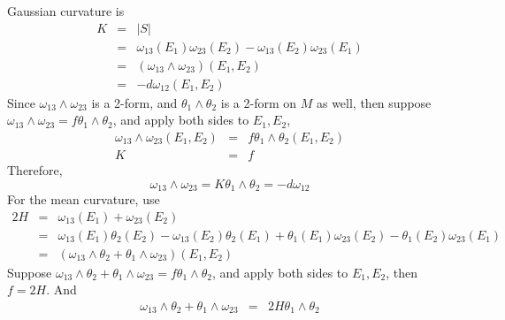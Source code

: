 \documentclass{article}
\newcommand{\exterior}{\wedge}
\begin{document}
Gaussian curvature is
\begin{eqnarray*}
  K & = & | S |\\
  & = & \omega_{13} (E_1) \omega_{23} (E_2) - \omega_{13} (E_2) \omega_{23}
  (E_1)\\
  & = & (\omega_{13} \exterior \omega_{23}) (E_1, E_2)\\
  & = & - d \omega_{12} (E_1, E_2)
\end{eqnarray*}
Since $\omega_{13} \exterior \omega_{23}$ is a 2-form, and $\theta_1 \exterior
\theta_2$ is a 2-form on $M$ as well, then suppose $\omega_{13} \exterior
\omega_{23} = f \theta_1 \exterior \theta_2$, and apply both sides to $E_1,
E_2$,
\begin{eqnarray*}
  \omega_{13} \exterior \omega_{23} (E_1, E_2) & = & f \theta_1 \exterior
  \theta_2 (E_1, E_2)\\
  K & = & f
\end{eqnarray*}
Therefore,
\begin{equation}
  \label{eqnG} \omega_{13} \exterior \omega_{23} = K \theta_1 \exterior
  \theta_2 = - d \omega_{12}
\end{equation}
For the mean curvature, use
\begin{eqnarray*}
  2 H & = & \omega_{13} (E_1) + \omega_{23} (E_2)\\
  & = & \omega_{13} (E_1) \theta_2 (E_2) - \omega_{13} (E_2) \theta_2 (E_1) +
  \theta_1 (E_1) \omega_{23} (E_2) - \theta_1 (E_2) \omega_{23} (E_1)\\
  & = & (\omega_{13} \exterior \theta_2 + \theta_1 \exterior \omega_{23})
  (E_1, E_2)
\end{eqnarray*}
Suppose $\omega_{13} \exterior \theta_2 + \theta_1 \exterior \omega_{23} = f
\theta_1 \exterior \theta_2$, and apply both sides to $E_1, E_2$, then $f = 2
H$. And
\begin{eqnarray}
  \omega_{13} \exterior \theta_2 + \theta_1 \exterior \omega_{23} & = & 2 H
  \theta_1 \exterior \theta_2 
\end{eqnarray}
\end{document}
